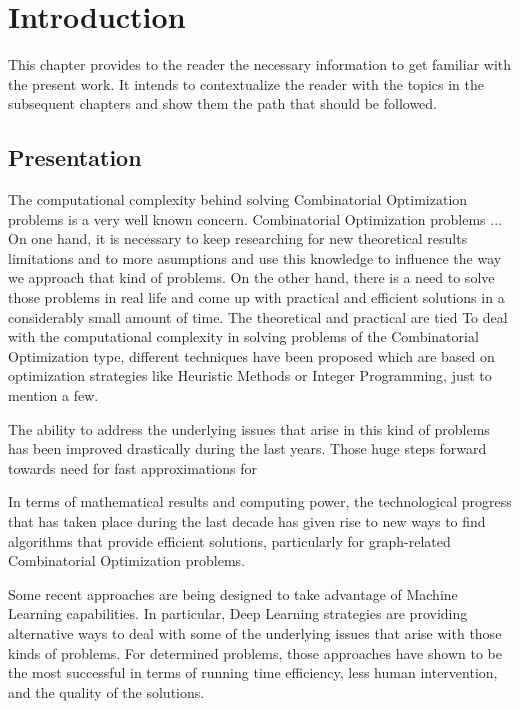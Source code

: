 %
%
\let\textcircled=\pgftextcircled
\chapter{Introduction}
\label{Chapter1}

This chapter provides to the reader the necessary information to get familiar with the present work. It intends to contextualize the reader with the topics in the subsequent chapters and show them the path that should be followed.

\section{Presentation}


The computational complexity behind solving Combinatorial Optimization problems is a very well known concern. 
Combinatorial Optimization problems ... On one hand, it is necessary to keep researching for new theoretical results limitations and to more asumptions and use this knowledge to influence the way we approach that kind of problems. On the other hand, there is a need to solve those problems in real life and come up with practical and efficient solutions in a considerably small amount of time. The theoretical and practical are tied
To deal with the computational complexity in solving problems of the Combinatorial Optimization type, different techniques have been proposed which are based on optimization strategies like Heuristic Methods or Integer Programming, just to mention a few.

The ability to address the underlying issues that arise in this kind of problems has been improved drastically during the last years. Those huge steps forward towards need for fast approximations for 

In terms of mathematical results and computing power, the technological progress that has taken place during the last decade has given rise to new ways to find algorithms that provide efficient solutions, particularly for graph-related Combinatorial Optimization problems.

Some recent approaches are being designed to take advantage of Machine Learning capabilities. In particular, Deep Learning strategies are providing alternative ways to deal with some of the underlying issues that arise with those kinds of problems. For determined problems, those approaches have shown to be the most successful in terms of running time efficiency, less human intervention, and the quality of the solutions. \\


